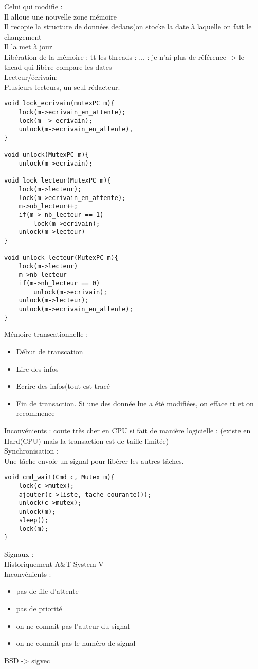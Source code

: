 \documentclass{article}
\begin{document}
Celui qui modifie :\\
Il alloue une nouvelle zone mémoire\\
Il recopie la structure de données dedans(on stocke la date à laquelle on fait le changement \\
Il la met à jour\\
Libération de la mémoire : tt les threads : ...  : je n'ai plus de référence -> le thead qui libère compare les dates\\

\vskip 1cm
Lecteur/écrivain:\\
Plusieurs lecteurs, un seul rédacteur.\\
\begin{verbatim}
void lock_ecrivain(mutexPC m){
	lock(m->ecrivain_en_attente);
	lock(m -> ecrivain);
	unlock(m->ecrivain_en_attente),
}

void unlock(MutexPC m){
	unlock(m->ecrivain);

void lock_lecteur(MutexPC m){
	lock(m->lecteur);
	lock(m->ecrivain_en_attente);
	m->nb_lecteur++;
	if(m-> nb_lecteur == 1)
		lock(m->ecrivain);
	unlock(m->lecteur)
}

void unlock_lecteur(MutexPC m){
	lock(m->lecteur)
	m->nb_lecteur--
	if(m->nb_lecteur == 0)
		unlock(m->ecrivain);
	unlock(m->lecteur);
	unlock(m->ecrivain_en_attente);
}
\end{verbatim}

\vskip 1cm
Mémoire transcationnelle :\\
\begin{itemize}
	\item Début de transcation
	\item Lire des infos
	\item Ecrire des infos(tout est tracé
	\item Fin de transaction. Si une des donnée lue a été modifiées, on efface tt et on recommence
\end{itemize}

Inconvénients : coute très cher en CPU si fait de manière logicielle : (existe en Hard(CPU) mais la transaction est de taille limitée)\\

\vskip 1cm
Synchronisation :\\
Une tâche envoie un signal pour libérer les autres tâches.\\
\begin{verbatim}
void cmd_wait(Cmd c, Mutex m){
	lock(c->mutex);
	ajouter(c->liste, tache_courante());
	unlock(c->mutex);
	unlock(m);
	sleep();
	lock(m);
}
\end{verbatim}
\vskip 1cm

Signaux :\\
Historiquement A\&T System V\\

Inconvénients : 
\begin{itemize}
	\item pas de file d'attente
	\item pas de priorité
	\item on ne connait pas l'auteur du signal
	\item on ne connait pas le numéro de signal
\end{itemize}

\vskip 1cm
BSD -> sigvec\\

\newpage
\section{}
\end{document}
